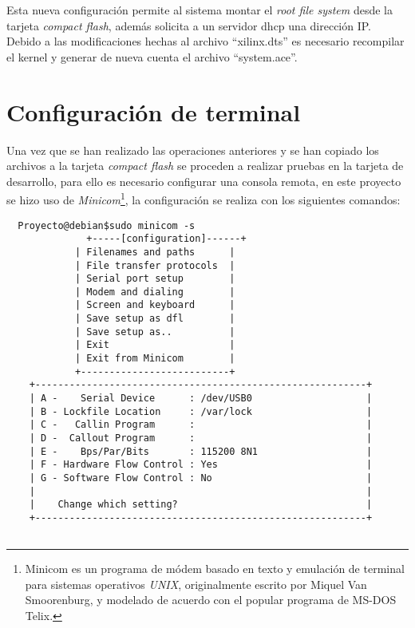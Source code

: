Esta nueva configuración  permite al sistema montar el \emph{root file system}
desde la tarjeta \emph{compact flash}, además solicita a un servidor dhcp una
dirección IP. Debido a las modificaciones hechas al archivo ``xilinx.dts'' es
necesario recompilar el kernel y generar de nueva cuenta el
archivo ``system.ace''.


\section{Configuración de terminal}

Una vez que se han realizado las operaciones anteriores y se han copiado los 
archivos a la tarjeta \emph{compact flash} se proceden a realizar pruebas en
la tarjeta de desarrollo, para ello es necesario configurar una consola remota,
en este proyecto se hizo uso de \emph{Minicom}\footnote{Minicom es un programa
de módem basado en texto y emulación de terminal para sistemas operativos
\emph{UNIX}, originalmente escrito por Miquel Van Smoorenburg, y modelado de
acuerdo con el popular programa de MS-DOS Telix.}, la configuración se realiza
con los siguientes comandos:

\begin{verbatim}
  Proyecto@debian$sudo minicom -s
              +-----[configuration]------+
            | Filenames and paths      |
            | File transfer protocols  |
            | Serial port setup        |
            | Modem and dialing        |
            | Screen and keyboard      |
            | Save setup as dfl        |
            | Save setup as..          |
            | Exit                     |
            | Exit from Minicom        |
            +--------------------------+
    +----------------------------------------------------------+
    | A -    Serial Device      : /dev/USB0                    |
    | B - Lockfile Location     : /var/lock                    |
    | C -   Callin Program      :                              |
    | D -  Callout Program      :                              |
    | E -    Bps/Par/Bits       : 115200 8N1                   |
    | F - Hardware Flow Control : Yes                          |
    | G - Software Flow Control : No                           |
    |                                                          |
    |    Change which setting?                                 |
    +----------------------------------------------------------+
    
\end{verbatim}

